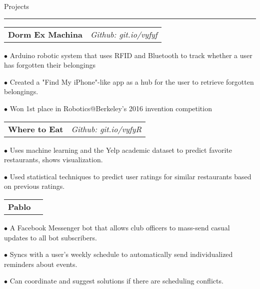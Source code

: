 \documentclass[11pt,letterpaper]{article}
\makeatletter
\newcommand{\bulletpoint}{\rule{0cm}{1pt}$\bullet$  }
\newenvironment{topic}[1]
    {
    \large #1
    \vspace*{0.03in}
    \hrule 
    \vspace*{0.05in}
    }
    {}
\newenvironment{event}
    {
    \begin{tabular*}{\textwidth}{l@{\extracolsep{\fill}}r}
    }
    {
    \end{tabular*}
    }
\newenvironment{detail}
    {
    \normalsize
    }
    {
    \vspace*{0.02in}
    }
\makeatother
\begin{document}
    \begin{topic}{Projects}
        \begin{event}
            \textbf{Dorm Ex Machina} & \emph{Github: git.io/vyfyf}
        \end{event}
            \begin{detail}
                \bulletpoint Arduino robotic system that uses RFID and Bluetooth to track whether a user has forgotten their belongings \\
                \bulletpoint Created a "Find My iPhone"-like app as a hub for the user to retrieve forgotten belongings. \\
                \bulletpoint Won 1st place in Robotics@Berkeley's 2016 invention competition

            \end{detail}

        \begin{event}
        \textbf{Where to Eat} & \emph{Github: git.io/vyfyR}
        \end{event}
            \begin{detail}
                \bulletpoint Uses machine learning and the Yelp academic dataset to predict favorite restaurants, shows visualization. \\
                \bulletpoint Used statistical techniques to predict user ratings for similar restaurants based on previous ratings.
            \end{detail}

        \begin{event}
        \textbf{Pablo}
        \end{event}
            \begin{detail}
                \bulletpoint A Facebook Messenger bot that allows club officers to mass-send casual updates to all bot subscribers. \\
                \bulletpoint Syncs with a user's weekly schedule to automatically send individualized reminders about events. \\
                \bulletpoint Can coordinate and suggest solutions if there are scheduling conflicts.  
            \end{detail}
    \end{topic} \vspace*{0.1in}
\end{document}
